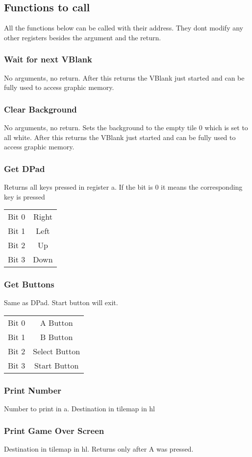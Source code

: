 \documentclass[a5paper,9pt]{extarticle}
\begin{document}
\begin{multicols}{2}
\subsection*{Functions to call}
All the functions below can be called with their address. They dont modify any other registers besides the argument and the return.
\subsubsection*{ Wait for next VBlank}
No arguments, no return. After this returns the VBlank just started and can be fully used to access graphic memory.
\subsubsection*{ Clear Background}
No arguments, no return. Sets the background to the empty tile 0 which is set to all white. After this returns the VBlank just started and can be fully used to access graphic memory.
\subsubsection*{ Get DPad}
Returns all keys pressed in register a. If the bit is 0 it means the corresponding key is pressed

\begin{tabular}{ c c }
    Bit 0 & Right \\
    Bit 1 & Left\\
    Bit 2 &  Up \\
    Bit 3 & Down
   \end{tabular}

\subsubsection*{ Get Buttons}
Same as DPad. Start button will exit.
   \begin{tabular}{ c c }
       Bit 0 & A Button \\
       Bit 1 & B Button\\
       Bit 2 &  Select Button \\
       Bit 3 & Start Button 
      \end{tabular}


\subsubsection*{ Print Number}
Number to print in a. Destination in tilemap  in hl

\subsubsection*{ Print Game Over Screen}
Destination in tilemap  in hl. Returns only after A was pressed.

\end{multicols}
\end{document}
